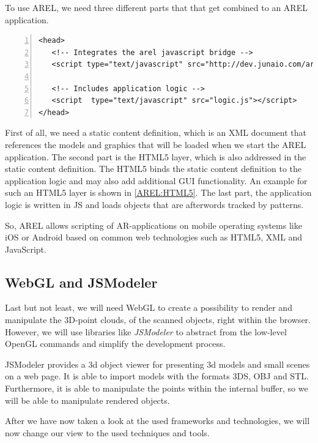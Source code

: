 To use \ac{AREL}, we need three different parts that that get combined to an \ac{AREL} application.

\begin{lstlisting}[numbers=left,caption={Example for the HTML5 AREL layer},label=AREL:HTML5,frame=tlbr,breaklines]
<head>
   <!-- Integrates the arel javascript bridge -->
   <script type="text/javascript" src="http://dev.junaio.com/arel/js/arel.js"></script>

   <!-- Includes application logic -->
   <script  type="text/javascript" src="logic.js"></script>
</head>
\end{lstlisting}

First of all, we need a static content definition, which is an \ac{XML} document that references the models and graphics that will be loaded when we start the \ac{AREL} application. The second part is the \ac{HTML5} layer, which is also addressed in the static content definition. The \ac{HTML5} binds the static content definition to the application logic and may also add additional \ac{GUI} functionality. An example for such an \ac{HTML5} layer is shown in \ref{AREL:HTML5}. The last part, the application logic is written in \ac{JS} and loads objects that are afterwords tracked by patterns.  

So, \ac{AREL} allows scripting of \ac{AR}-applications on mobile operating systems like iOS or Android based on common web technologies such as \ac{HTML5}, \ac{XML} and JavaScript. 

\subsection{WebGL and JSModeler}
Last but not least, we will need \ac{WebGL} to create a possibility to render and manipulate the 3D-point clouds, of the scanned objects, right within the browser. However, we will use libraries like \emph{JSModeler} to abstract from the low-level OpenGL commands and simplify the development process.

JSModeler provides a 3d object viewer for presenting 3d models and small scenes on a web page. It is able to import models with the formats 3DS, OBJ and STL. Furthermore, it is able to manipulate the points within the internal buffer, so we will be able to manipulate rendered objects. 

After we have now taken a look at the used frameworks and technologies, we will now change our view to the used techniques and tools.

